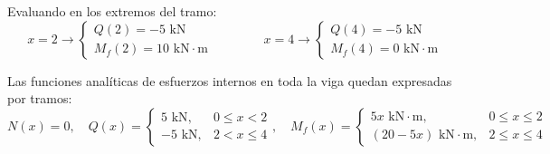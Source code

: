 Evaluando en los extremos del tramo:
\begin{equation}
    x = 2 \longrightarrow \begin{cases} Q(2) = -5\text{ kN} \\ M_f(2) = 10\text{ kN}\cdot\text{m} \end{cases}
    \qquad\qquad
    x = 4 \longrightarrow \begin{cases} Q(4) = -5\text{ kN} \\ M_f(4) = 0\text{ kN}\cdot\text{m} \end{cases}
\end{equation}


Las funciones analíticas de esfuerzos internos en toda la viga quedan expresadas por tramos:
\begin{equation}
    N(x) = 0, \quad
    Q(x) = \begin{cases}
        5\text{ kN},  & 0 \leq x < 2 \\
        -5\text{ kN}, & 2 < x \leq 4
    \end{cases}, \quad
    M_f(x) = \begin{cases}
        5x\text{ kN}\cdot\text{m},        & 0 \leq x \leq 2 \\
        (20 - 5x)\text{ kN}\cdot\text{m}, & 2 \leq x \leq 4
    \end{cases}
\end{equation}

